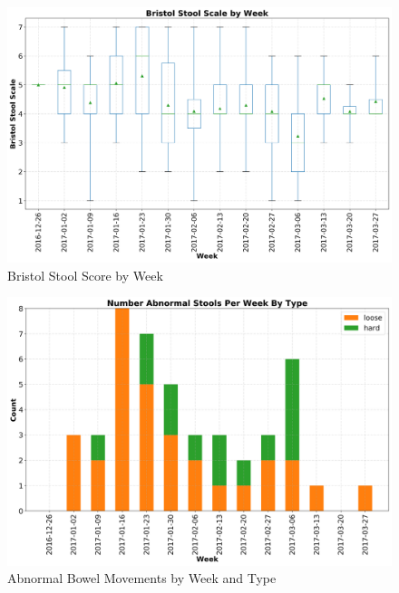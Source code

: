 \documentclass[conference]{IEEEtran}
\begin{document}
\begin{figure}[t]
    \centering
    \includegraphics[width=\columnwidth]{bss_box_whisker.png}
    \caption{Bristol Stool Score by Week}\label{fig:bss_box_whisker}
\end{figure}



\begin{figure}[t]
    \centering
    \includegraphics[width=\columnwidth]{abnormal.png}
    \caption{Abnormal Bowel Movements by Week and Type}\label{fig:bss_abnormal}
\end{figure}
\end{document}
